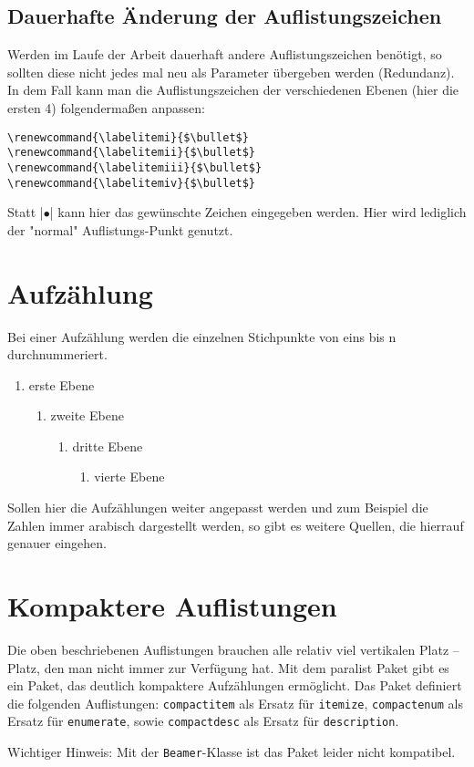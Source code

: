 \subsection{Dauerhafte Änderung der Auflistungszeichen}
Werden im Laufe der Arbeit dauerhaft andere Auflistungszeichen benötigt, so sollten diese nicht jedes mal neu als Parameter übergeben werden (Redundanz). 
In dem Fall kann man die Auflistungszeichen der verschiedenen Ebenen (hier die ersten 4) folgendermaßen anpassen:
\begin{lstlisting}
\renewcommand{\labelitemi}{$\bullet$}
\renewcommand{\labelitemii}{$\bullet$}
\renewcommand{\labelitemiii}{$\bullet$}
\renewcommand{\labelitemiv}{$\bullet$}
\end{lstlisting}
Statt \befehl|$\bullet$| kann hier das gewünschte Zeichen eingegeben werden. Hier wird lediglich der "normal" Auflistungs-Punkt genutzt.

\section{Aufzählung}
Bei einer Aufzählung werden die einzelnen Stichpunkte von eins bis n durchnummeriert.
\begin{enumerate}
    \item erste Ebene
    \begin{enumerate}
        \item zweite Ebene
        \begin{enumerate}
            \item dritte Ebene
            \begin{enumerate}
                \item vierte Ebene
            \end{enumerate}
        \end{enumerate}
    \end{enumerate}
\end{enumerate}
Sollen hier die Aufzählungen weiter angepasst werden und zum Beispiel die Zahlen immer arabisch dargestellt werden, so gibt es weitere Quellen, die hierrauf genauer eingehen.\autocite{auflistungen}


\section{Kompaktere Auflistungen}

Die oben beschriebenen Auflistungen brauchen alle relativ viel vertikalen Platz -- Platz, den man nicht immer zur Verfügung hat. 
Mit dem paralist Paket gibt es ein Paket, das deutlich kompaktere Aufzählungen ermöglicht. 
Das Paket definiert die folgenden Auflistungen: \texttt{compactitem} als Ersatz für \texttt{itemize}, \texttt{compactenum} als Ersatz für \texttt{enumerate}, sowie \texttt{compactdesc} als Ersatz für \texttt{description}.

Wichtiger Hinweis: Mit der \texttt{Beamer}-Klasse ist das Paket leider nicht kompatibel.



